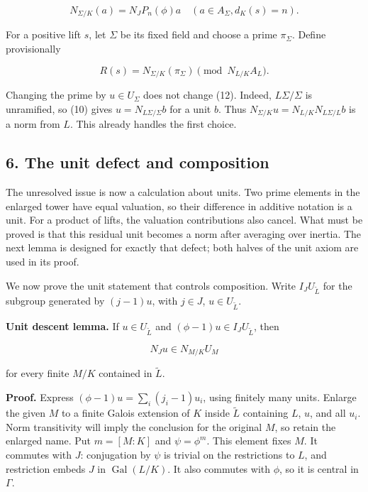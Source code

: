 \documentclass[11pt,a4paper]{article}
\begin{document}
\[
N_{\Sigma/K}(a)=N_JP_n(\phi)a
\quad(a\in A_\Sigma, d_K(s)=n).
\tag{11}
\]

For a positive lift \(s\), let \(\Sigma\) be its fixed field and choose
a prime \(\pi_\Sigma\). Define provisionally

\[
R(s)=N_{\Sigma/K}(\pi_\Sigma)\pmod{N_{L/K}A_L}.
\tag{12}
\]

Changing the prime by \(u\in U_\Sigma\) does not change (12). Indeed,
\(L\Sigma/\Sigma\) is unramified, so (10) gives
\(u=N_{L\Sigma/\Sigma}b\) for a unit \(b\). Thus
\(N_{\Sigma/K}u=N_{L/K}N_{L\Sigma/L}b\) is a norm from \(L\). This
already handles the first choice.

\subsection{6. The unit defect and
composition}\label{the-unit-defect-and-composition}

The unresolved issue is now a calculation about units. Two prime
elements in the enlarged tower have equal valuation, so their difference
in additive notation is a unit. For a product of lifts, the valuation
contributions also cancel. What must be proved is that this residual
unit becomes a norm after averaging over inertia. The next lemma is
designed for exactly that defect; both halves of the unit axiom are used
in its proof.

We now prove the unit statement that controls composition. Write
\(I_JU_{\widetilde L}\) for the subgroup generated by \((j-1)u\), with
\(j\in J\), \(u\in U_{\widetilde L}\).

\textbf{Unit descent lemma.} If \(u\in U_{\widetilde L}\) and
\((\phi-1)u\in I_JU_{\widetilde L}\), then

\[
N_Ju\in N_{M/K}U_M
\]

for every finite \(M/K\) contained in \(\widetilde L\).

\textbf{Proof.} Express \((\phi-1)u=\sum_i(j_i-1)u_i\), using finitely
many units. Enlarge the given \(M\) to a finite Galois extension of
\(K\) inside \(\widetilde L\) containing \(L\), \(u\), and all \(u_i\).
Norm transitivity will imply the conclusion for the original \(M\), so
retain the enlarged name. Put \(m=[M:K]\) and \(\psi=\phi^m\). This
element fixes \(M\). It commutes with \(J\): conjugation by \(\psi\) is
trivial on the restrictions to \(L\), and restriction embeds \(J\) in
\(\operatorname{Gal}(L/K)\). It also commutes with \(\phi\), so it is
central in \(\Gamma\).
\end{document}
